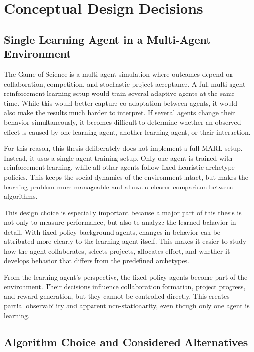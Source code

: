 \documentclass[english,bachelor]{hsluthesis}
\begin{document}
\section{Conceptual Design Decisions}

\subsection{Single Learning Agent in a Multi-Agent Environment}

The Game of Science is a multi-agent simulation where outcomes depend on collaboration, competition, and stochastic project acceptance. A full multi-agent reinforcement learning setup would train several adaptive agents at the same time. While this would better capture co-adaptation between agents, it would also make the results much harder to interpret. If several agents change their behavior simultaneously, it becomes difficult to determine whether an observed effect is caused by one learning agent, another learning agent, or their interaction.

For this reason, this thesis deliberately does not implement a full MARL setup. Instead, it uses a single-agent training setup. Only one agent is trained with reinforcement learning, while all other agents follow fixed heuristic archetype policies. This keeps the social dynamics of the environment intact, but makes the learning problem more manageable and allows a clearer comparison between algorithms.

This design choice is especially important because a major part of this thesis is not only to measure performance, but also to analyze the learned behavior in detail. With fixed-policy background agents, changes in behavior can be attributed more clearly to the learning agent itself. This makes it easier to study how the agent collaborates, selects projects, allocates effort, and whether it develops behavior that differs from the predefined archetypes.

From the learning agent's perspective, the fixed-policy agents become part of the environment. Their decisions influence collaboration formation, project progress, and reward generation, but they cannot be controlled directly. This creates partial observability and apparent non-stationarity, even though only one agent is learning.

\subsection{Algorithm Choice and Considered Alternatives}
\end{document}
